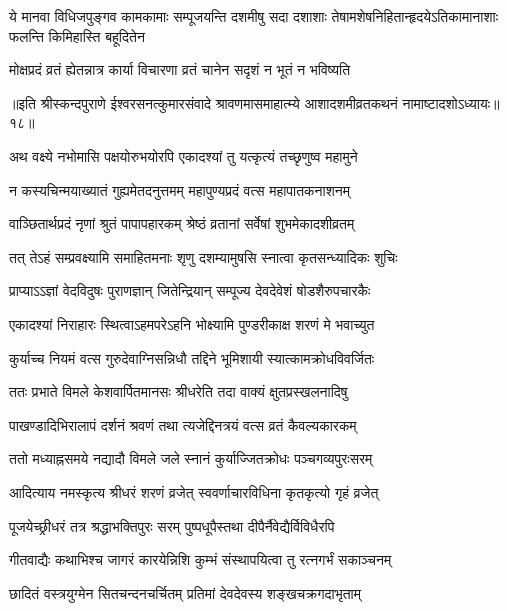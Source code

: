 \fourlineindentedshloka
{ये मानवा विधिजपुङ्गव कामकामाः}
{सम्पूजयन्ति दशमीषु सदा दशाशाः}
{तेषामशेषनिहितान्हृदयेऽतिकामानाशाः}
{फलन्ति किमिहास्ति बहूदितेन} %

\twolineshloka
{मोक्षप्रदं व्रतं ह्येतन्नात्र कार्या विचारणा}
{व्रतं चानेन सदृशं न भूतं न भविष्यति} %


{॥इति श्रीस्कन्दपुराणे ईश्वरसनत्कुमारसंवादे श्रावणमासमाहात्म्ये आशादशमीव्रतकथनं नामाष्टादशोऽध्यायः॥१८॥}





\twolineshloka
{अथ वक्ष्ये नभोमासि पक्षयोरुभयोरपि}
{एकादश्यां तु यत्कृत्यं तच्छृणुष्व महामुने} %

\twolineshloka
{न कस्यचिन्मयाख्यातं गुह्यमेतदनुत्तमम्}
{महापुण्यप्रदं वत्स महापातकनाशनम्} %

\twolineshloka
{वाञ्छितार्थप्रदं नृणां श्रुतं पापापहारकम्}
{श्रेष्ठं व्रतानां सर्वेषां शुभमेकादशीव्रतम्} %

\twolineshloka
{तत् तेऽहं सम्प्रवक्ष्यामि समाहितमनाः शृणु}
{दशम्यामुषसि स्नात्वा कृतसन्ध्यादिकः शुचिः} %

\twolineshloka
{प्राप्याऽऽज्ञां वेदविदुषः पुराणज्ञान् जितेन्द्रियान्}
{सम्पूज्य देवदेवेशं षोडशैरुपचारकैः} %

\twolineshloka
{एकादश्यां निराहारः स्थित्वाऽहमपरेऽहनि}
{भोक्ष्यामि पुण्डरीकाक्ष शरणं मे भवाच्युत} %

\twolineshloka
{कुर्याच्च नियमं वत्स गुरुदेवाग्निसन्निधौ}
{तद्दिने भूमिशायी स्यात्कामक्रोधविवर्जितः} %

\twolineshloka
{ततः प्रभाते विमले केशवार्पितमानसः}
{श्रीधरेति तदा वाक्यं क्षुतप्रस्खलनादिषु} %

\twolineshloka
{पाखण्डादिभिरालापं दर्शनं श्रवणं तथा}
{त्यजेद्दिनत्रयं वत्स व्रतं कैवल्यकारकम्} %

\twolineshloka
{ततो मध्याह्नसमये नद्यादौ विमले जले}
{स्नानं कुर्याज्जितक्रोधः पञ्चगव्यपुरःसरम्} %

\twolineshloka
{आदित्याय नमस्कृत्य श्रीधरं शरणं व्रजेत्}
{स्ववर्णाचारविधिना कृतकृत्यो गृहं व्रजेत्} %

\twolineshloka
{पूजयेच्छ्रीधरं तत्र श्रद्धाभक्तिपुरः सरम्}
{पुष्पधूपैस्तथा दीपैर्नैवेद्यैर्विविधैरपि} %

\twolineshloka
{गीतवाद्यैः कथाभिश्च जागरं कारयेन्निशि}
{कुम्भं संस्थापयित्वा तु रत्नगर्भं सकाञ्चनम्} %

\twolineshloka
{छादितं वस्त्रयुग्मेन सितचन्दनचर्चितम्}
{प्रतिमां देवदेवस्य शङ्खचक्रगदाभृताम्} %

